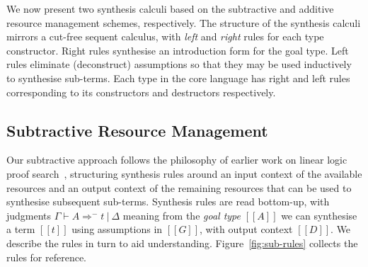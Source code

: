 We now present two synthesis calculi based on the subtractive and additive
resource management schemes, respectively. The structure of the synthesis
calculi mirrors a cut-free sequent calculus, with \textit{left} and
\textit{right} rules for each type constructor. Right rules synthesise an
introduction form for the goal type. Left rules eliminate (deconstruct)
assumptions so that they may be used inductively to synthesise sub-terms. Each
type in the core language has right and left rules corresponding to its
constructors and destructors respectively.

\subsection{Subtractive Resource Management}
\label{subsec:subtractive}
  Our subtractive approach follows the philosophy of earlier work on
  linear logic proof search~\citep{HODAS1994327,CERVESATO2000133},
  structuring synthesis rules around an input context of the available
  resources and an output context of the remaining resources that
  can be used to synthesise subsequent sub-terms. Synthesis rules
  are read bottom-up, with judgments $\Gamma \vdash A \Rightarrow^{-} t\ |\ \Delta$
  meaning from the \emph{goal type} $[[A]]$ we can synthesise a term $[[t]]$ using
  assumptions in $[[G]]$, with output context $[[D]]$. We describe
  the rules in turn to aid understanding. Figure~\ref{fig:sub-rules} collects the
  rules for reference.
